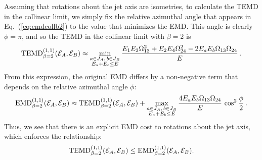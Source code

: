 \documentclass[letterpaper,11pt]{article}
\DeclareRobustCommand{\Eq}[1]{Eq.~(\ref{#1})}
\begin{document}
Assuming that rotations about the jet axis are isometries, to calculate the TEMD in the collinear limit, we simply fix the relative azimuthal angle that appears in \Eq{eq:emdcollb2} to the value that minimizes the EMD.
%
This angle is clearly $\phi = \pi$, and so the TEMD in the collinear limit with $\beta = 2$ is
%
\begin{align}\label{eq:mintemd2}
\text{TEMD}^{(1,1)}_{\beta=2}({\cal E}_A,{\cal E}_B) \approx
\min_{\substack{a\in J_A,\,b\in J_B\\E_a+E_b\leq E}}\frac{E_1E_{3}\Omega_{13}^2+E_2E_{4}\Omega_{24}^2-2E_a E_b\Omega_{13}\Omega_{24}}{E}
\,.
\end{align}
%
From this expression, the original EMD differs by a non-negative term that depends on the relative azimuthal angle $\phi$:  
%
\begin{align}
\text{EMD}^{(1,1)}_{\beta=2}({\cal E}_A,{\cal E}_B) \approx  \text{TEMD}^{(1,1)}_{\beta=2}({\cal E}_A,{\cal E}_B) +
\max_{\substack{a\in J_A,\,b\in J_B\\E_a+E_b\leq E}}\frac{4E_a E_b\Omega_{13}\Omega_{24}}{E}\,\cos^2\frac{\phi}{2}\,.
\end{align}
%
Thus, we see that there is an explicit EMD cost to rotations about the jet axis, which enforces the relationship:
%
\begin{align}
\text{TEMD}^{(1,1)}_{\beta=2}({\cal E}_A,{\cal E}_B) \leq \text{EMD}^{(1,1)}_{\beta=2}({\cal E}_A,{\cal E}_B).
\end{align}
\end{document}
